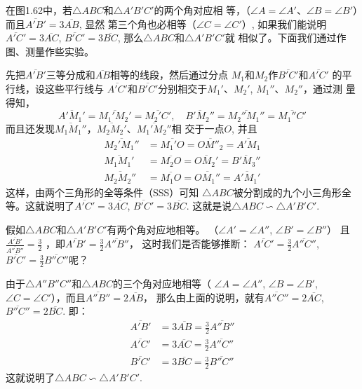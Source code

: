 在图1.62中，若$\triangle ABC$和$\triangle A'B'C'$的两个角对应相
等，（$\angle A=\angle A'$、$\angle B=\angle B'$）而且$\overline{A'B'}=3\overline{AB}$, 
显然
第三个角也必相等（$\angle C=\angle C'$）, 如果我们能说明
$\overline{A'C'}=3\overline{AC}$, $\overline{B'C'}=3\overline{BC}$, 那么$\triangle ABC$和$\triangle A'B'C'$就
相似了。下面我们通过作图、测量作些实验。

先把$\overline{A'B'}$三等分成和$\overline{AB}$相等的线段，然后通过分点
${M_1}$和$M_2$作$\overline{B'C'}$和$\overline{A'C'}$
的平行线，设这些平行线与
$\overline{A'C'}$和$\overline{B'C'}$分别相交于$M_1'$、$M_2'$, $M_1''$、$M_2''$，通过测
量得知，
\[\overline{A'M_1'}=\overline{M_1'M_2'}=\overline{M_2'C'},\quad \overline{B'M_2''}=\overline{M_2''M_1''}
=\overline{M_1''C'}\]
而且还发现$\overline{M_1M_1''}$，$\overline{M_2M_2'}$、$\overline{M_1'M_2''}$相
交于一点$O$, 并且
\[\begin{split}
	\overline{M_2'M_1''}&=\overline{M_1'O}=\overline{OM''_2}=\overline{A'M_1}\\
	\overline{M_1M_1'}&=\overline{M_2O}=\overline{OM_2'}=\overline{B'M_3''}\\
	\overline{M_2M_2''}&=\overline{M_1O}=\overline{OM_1''}=\overline{A'M_1'}
\end{split}\]
这样，由两个三角形的全等条件（SSS）可知
$\triangle ABC$被分割成的九个小三角形全等。这就说明了$\overline{A'C'}=3\overline{AC}$, $\overline{B'C'}=3\overline{BC}$. 这就是说$\triangle ABC\backsim \triangle A'B'C'$.

假如$\triangle ABC$和$\triangle A'B'C'$有两个角对应地相等。
（$\angle A'=\angle A''$, $\angle B'=\angle B''$）
且$\frac{\overline{A'B'}}{\overline{A''B''}}=\frac{3}{2}$
，即$\overline{A'B'}=\frac{3}{2}\overline{A''B''}$，
这时我们是否能够推断：
$\overline{A'C'}=\frac{3}{2}\overline{A''C''}$, $\overline{B'C'}=\frac{3}{2}\overline{B''C''}$呢？

由于$\triangle A''B''C''$和$\triangle ABC$的三个角对应地相等（
$\angle A=\angle A''$, $\angle B=\angle B'$, $\angle C=\angle C'$），而且$\overline{A''B''}=2\overline{AB}$，
那么由上面的说明，就有$\overline{A''C''}=2\overline{AC}$, $\overline{B''C''}=2\overline{BC}$. 
即：
\[\begin{split}
	\overline{A'B'}&=3\overline{AB}=\frac{3}{2}\overline{A''B''}\\
	\overline{A'C'}&=3\overline{AC}=\frac{3}{2}\overline{A''C''}\\
 \overline{B'C'}&=3\overline{BC}=\frac{3}{2}\overline{B''C''}
\end{split}
	\]
这就说明了$\triangle ABC\backsim \triangle A'B'C'$.

